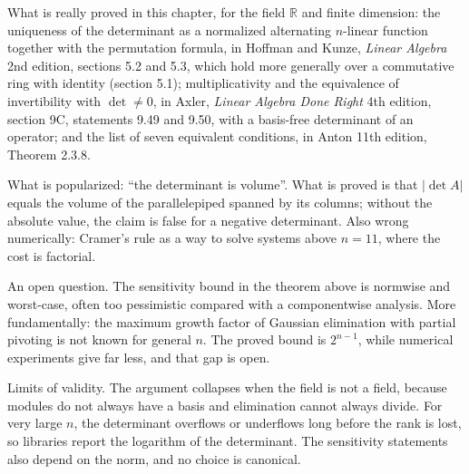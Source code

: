 \begin{untukpeneliti}
What is really proved in this chapter, for the field $\mathbb{R}$ and finite dimension: the
uniqueness of the determinant as a normalized alternating $n$-linear function together with the
permutation formula, in Hoffman and Kunze, \emph{Linear Algebra} 2nd edition, sections 5.2 and
5.3, which hold more generally over a commutative ring with identity (section 5.1);
multiplicativity and the equivalence of invertibility with $\det\neq0$, in Axler,
\emph{Linear Algebra Done Right} 4th edition, section 9C, statements 9.49 and 9.50, with a
basis-free determinant of an operator; and the list of seven equivalent conditions, in Anton
11th edition, Theorem 2.3.8.

What is popularized: ``the determinant is volume''. What is proved is that $|\det A|$ equals the
volume of the parallelepiped spanned by its columns; without the absolute value, the claim is
false for a negative determinant. Also wrong numerically: Cramer's rule as a way to solve
systems above $n=11$, where the cost is factorial.

An open question. The sensitivity bound in the theorem above is normwise and worst-case, often
too pessimistic compared with a componentwise analysis. More fundamentally: the maximum growth
factor of Gaussian elimination with partial pivoting is not known for general $n$. The proved
bound is $2^{n-1}$, while numerical experiments give far less, and that gap is open.

Limits of validity. The argument collapses when the field is not a field, because modules do not
always have a basis and elimination cannot always divide. For very large $n$, the determinant
overflows or underflows long before the rank is lost, so libraries report the logarithm of the
determinant. The sensitivity statements also depend on the norm, and no choice is canonical.
\end{untukpeneliti}

